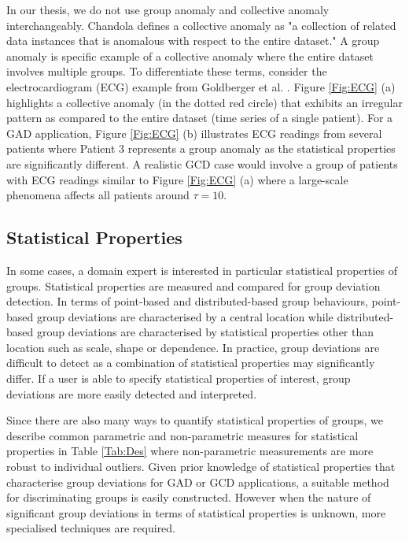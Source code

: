 In our thesis, we do not use group anomaly and  collective anomaly interchangeably.  Chandola \cite{Chandola} defines a collective anomaly  as "a collection of related data instances that is anomalous with respect to the entire dataset." 
A group anomaly is specific example of a collective anomaly where  
the entire dataset involves multiple groups. %
To differentiate these terms, consider the electrocardiogram (ECG) example from Goldberger et al. \cite{Goldberger}.  Figure \ref{Fig:ECG} (a) highlights a collective anomaly (in the dotted red circle) that exhibits an irregular pattern as compared to the  entire dataset (time series of a single patient). For a GAD application,  Figure \ref{Fig:ECG} (b) illustrates ECG readings from several patients  where  Patient 3 represents a group anomaly as the statistical properties are significantly different.  %
 A realistic GCD case  would involve a group of patients with ECG readings similar to Figure \ref{Fig:ECG} (a) where a large-scale phenomena affects all patients around $\tau=10$. 
 


\subsection{Statistical Properties}
 In some cases, a domain expert is interested in particular  statistical properties of groups. Statistical properties are measured and compared for group deviation detection. In terms of point-based and distributed-based group behaviours, point-based group deviations are characterised by a central location while distributed-based group deviations are characterised by statistical properties other than location such as scale, shape or dependence. In practice, group deviations are difficult to detect as a combination of statistical properties may  significantly differ. If a user is able to specify statistical properties of interest, group deviations are more easily detected and interpreted. 

 Since there are also many ways to quantify statistical properties of groups, we describe common parametric and non-parametric measures for statistical properties in Table \ref{Tab:Des} where non-parametric measurements are more robust to individual outliers. %
   Given prior knowledge of statistical properties that characterise group deviations for GAD or GCD applications, a suitable method for discriminating groups is easily constructed. However when the nature of significant group deviations in terms of statistical properties is unknown, more   specialised techniques are required.  
 
